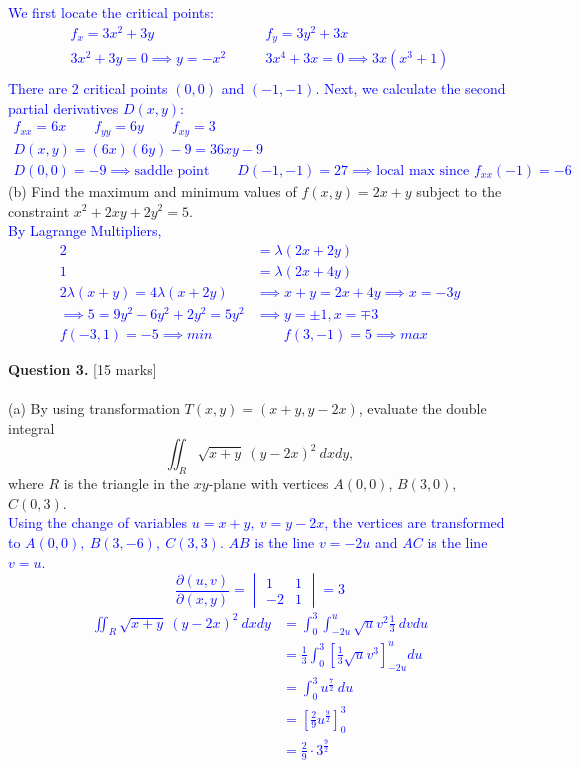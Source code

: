 \documentclass[12pt]{article}
\begin{document}
\textcolor{blue}{
We first locate the critical points:\\
\begin{align*}
	f_x=3x^2+3y &\qquad f_y=3y^2+3x\\
	3x^2+3y=0\implies y=-x^2 &\qquad 3x^4+3x=0\implies 3x(x^3+1)\\
\end{align*}
\indent There are 2 critical points $(0,0)$ and $(-1,-1)$. Next, we calculate the second partial derivatives $D(x,y)$:
\begin{gather*}
	f_{xx}=6x\qquad f_{yy}=6y\qquad f_{xy}=3\\
	D(x,y)=(6x)(6y)-9=36xy-9\\
	D(0,0)=-9\implies\text{saddle point} \qquad D(-1,-1)=27\implies\text{local max since }f_{xx}(-1)=-6
\end{gather*}
}
(b) Find the maximum and minimum values of $f(x,y)=2x+y$ subject to the constraint $x^2+2xy+2y^2=5$.\\

\textcolor{blue}{
By Lagrange Multipliers, \begin{align*}
	2&=\lambda (2x+2y)\\
	1&=\lambda (2x+4y)\\
	2\lambda(x+y)=4\lambda(x+2y)&\implies x+y=2x+4y\implies x=-3y\\
	\implies 5=9y^2-6y^2+2y^2=5y^2&\implies y=\pm1,x=\mp3\\
	f(-3,1)=-5\implies min &\qquad f(3,-1)=5\implies max
\end{align*}
}

{\bf Question 3.} [15 marks]\\
\\\indent
(a) By using transformation $T(x,y)=(x+y,y-2x)$, evaluate the double integral
\[
\iint_R\sqrt{x+y}\ (y-2x)^2\ dxdy,
\]
\indent\indent where $R$ is the triangle in the $xy$-plane with vertices $A(0,0)$, $B(3,0)$, $C(0,3)$.\\

\textcolor{blue}{
Using the change of variables $u=x+y,\ v=y-2x$, the vertices are transformed to $A(0,0),\ B(3,-6),\ C(3,3)$. $AB$ is the line $v=-2u$ and $AC$ is the line $v=u$.
\[
\frac{\partial(u,v)}{\partial(x,y)}=\begin{vmatrix}
	1 & 1\\
	-2 & 1
\end{vmatrix}=3
\]
\begin{align*}
	\iint_R\sqrt{x+y}\ (y-2x)^2\ dxdy &= \int_{0}^{3}\int_{-2u}^{u}\sqrt{u}v^2\frac{1}{3}\ dvdu\\
	&=\frac{1}{3}\int_{0}^{3}\left[\frac{1}{3}\sqrt{u}v^3\right]_{-2u}^{u}du\\
	&=\int_{0}^{3}u^{\frac{7}{2}}\ du\\
	&=\left[\frac{2}{9}u^{\frac{9}{2}}\right]_{0}^{3}\\
	&=\frac{2}{9}\cdot3^{\frac{9}{2}}
\end{align*}}
\end{document}
